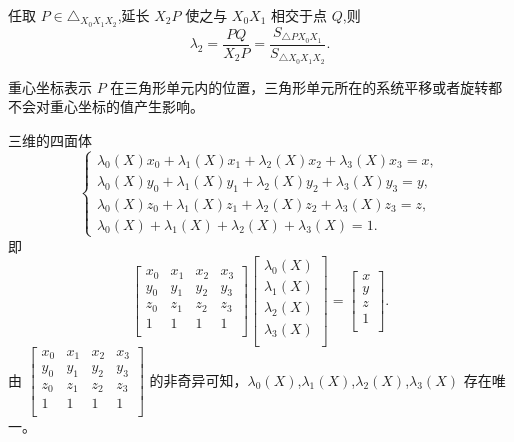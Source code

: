 \documentclass[12pt,a4paper]{article}
\begin{document}
任取 $P\in \triangle_{X_0 X_1 X_2}$,延长 $X_2 P$ 使之与 $X_0 X_1$ 相交于点 $Q$,则
$$
\lambda _2=\frac {PQ}{X_2 P}=\frac{S_{\triangle PX_0 X_1}}{S_{\triangle X_0 X_1 X_2}}.
$$

重心坐标表示 $P$ 在三角形单元内的位置，三角形单元所在的系统平移或者旋转都不会对重心坐标的值产生影响。

三维的四面体
$$
\begin{cases}
\lambda _0(X)x_0+\lambda _1(X)x_1+\lambda _2(X)x_2+\lambda _3(X)x_3=x,\\
\lambda _0(X)y_0+\lambda _1(X)y_1+\lambda _2(X)y_2+\lambda _3(X)y_3=y,\\
\lambda _0(X)z_0+\lambda _1(X)z_1+\lambda _2(X)z_2+\lambda _3(X)z_3=z,\\
\lambda _0(X)+\lambda _1(X)+\lambda _2(X)+\lambda _3(X)=1.
\end{cases}
$$
即
$$
\begin{bmatrix}
x_0 & x_1 & x_2 & x_3\\
y_0 & y_1 & y_2 & y_3\\
z_0 & z_1 & z_2 & z_3\\
1 & 1 & 1 &1\\
\end{bmatrix}
\begin{bmatrix}
\lambda _0(X)\\
\lambda _1(X)\\
\lambda _2(X)\\
\lambda _3(X)\\
\end{bmatrix}=\begin{bmatrix}
x\\
y\\
z\\
1\\
\end{bmatrix}.
$$
由 $\begin{bmatrix}
x_0 & x_1 & x_2 & x_3\\
y_0 & y_1 & y_2 & y_3\\
z_0 & z_1 & z_2 & z_3\\
1 & 1 & 1 &1\\
\end{bmatrix}$ 的非奇异可知，$\lambda _0(X)$,$\lambda _1(X)$,$\lambda _2(X)$,$\lambda _3(X)$ 存在唯一。
\end{document}
